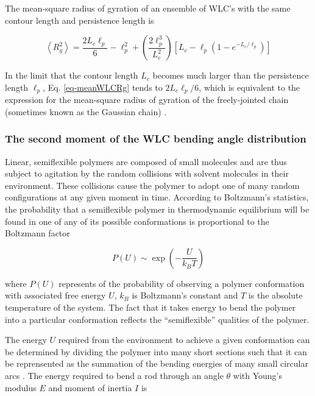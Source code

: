 \documentclass[12pt, a4paper]{article}
\begin{document}
The mean-square radius of gyration of an ensemble of WLC's with the
same contour length and persistence length is \cite{nakamura-2008}

\begin{equation}
  \label{eq-meanWLCRg}
  \left< R_{g}^2 \right> = \frac{2 L_{c} \ell_{p}}{6} - \ell_{p}^2 + \left( \frac{2 \ell_p^3}{L_c^2} \right) \left[ L_c - \ell_p \left( 1 - e^{-L_c/\ell_p} \right) \right]
\end{equation}

In the limit that the contour length $L_c$ becomes much larger than
the persistence length $\ell_p$, Eq. \eqref{eq-meanWLCRg} tends to
$2 L_c \ell_{p}/6$, which is equivalent to the expression for the
mean-square radius of gyration of the freely-jointed chain
(sometimes known as the Gaussian chain) \cite{phillips-pbotc-2009}.

\subsubsection{The second moment of the WLC bending angle distribution}
\label{sec-2-1-1}

Linear, semiflexible polymers are composed of small molecules and
are thus subject to agitation by the random collisions with
solvent molecules in their environment. These collisions cause the
polymer to adopt one of many random configurations at any given
moment in time. According to Boltzmann's statistics, the
probability that a semiflexible polymer in thermodynamic
equilibrium will be found in one of any of its possible
conformations is proportional to the Boltzmann factor

\begin{equation}
  \label{eq-boltzmann}
  P \left( U \right) \sim \exp \left( -\frac{U}{k_B T}\right)
\end{equation}

where $P \left( U \right)$ represents of the probability of
observing a polymer conformation with associated free energy $U$,
$k_B$ is Boltzmann's constant and $T$ is the absolute temperature
of the system. The fact that it takes energy to bend the polymer
into a particular conformation reflects the ``semiflexible''
qualities of the polymer.

The energy $U$ required from the environment to achieve a given
conformation can be determined by dividing the polymer into many
short sections such that it can be reprensented as the summation
of the bending energies of many small circular arcs
\cite{phillips-pbotc-2009}. The energy required to bend a rod
through an angle $\theta$ with Young's modulus $E$ and moment of
inertia $I$ is
\end{document}
